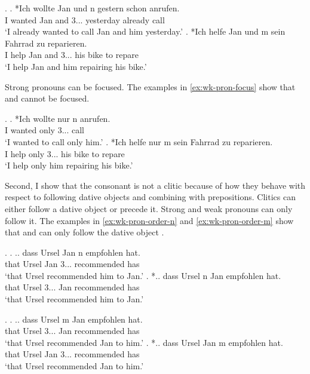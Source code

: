 \ex.\label{ex:wk-pron-coord}
\ag. *Ich wollte Jan und n gestern schon anrufen.\\
 I wanted Jan and 3... yesterday already call\\
 `I already wanted to call Jan and him yesterday.'
\bg. *Ich helfe Jan und m sein Fahrrad zu reparieren.\\
 I help Jan and 3... his bike to repare\\
 `I help Jan and him repairing his bike.'

Strong pronouns can be focused.
The examples in \ref{ex:wk-pron-focus} show that  and  cannot be focused.

\ex.\label{ex:wk-pron-focus}
\ag. *Ich wollte nur n anrufen.\\
 I wanted only 3... call\\
 `I wanted to call only him.'
\bg. *Ich helfe nur m sein Fahrrad zu reparieren.\\
 I help only 3... his bike to repare\\
 `I help only him repairing his bike.'

Second, I show that the consonant is not a clitic because of how they behave with respect to following dative objects and combining with prepositions.
Clitics can either follow a dative object or precede it. Strong and weak pronouns can only follow it.
The examples in \ref{ex:wk-pron-order-n} and \ref{ex:wk-pron-order-m} show that  and  can only follow the dative object .

\ex.\label{ex:wk-pron-order-n}
\ag. .. dass Ursel Jan n empfohlen hat.\\
 {} that Ursel Jan 3... recommended has\\
 `that Ursel recommended him to Jan.'
\bg. *.. dass Ursel n Jan empfohlen hat.\\
{} that Ursel 3... Jan recommended has\\
`that Ursel recommended him to Jan.'

\ex.\label{ex:wk-pron-order-m}
\ag. .. dass Ursel m Jan empfohlen hat.\\
 {} that Ursel 3... Jan recommended has\\
 `that Ursel recommended Jan to him.'
\bg. *.. dass Ursel Jan m empfohlen hat.\\
{} that Ursel Jan 3... recommended has\\
`that Ursel recommended Jan to him.'

